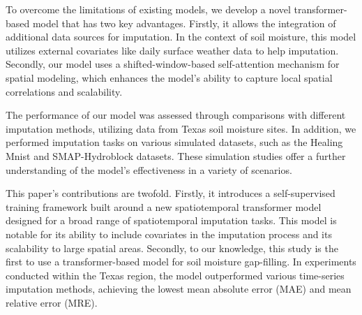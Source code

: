 \documentclass[11pt]{article}
\begin{document}
To overcome the limitations of existing models, we develop a novel transformer-based model that has two key advantages. Firstly, it allows the integration of additional data sources for imputation. In the context of soil moisture, this model utilizes external covariates like daily surface weather data to help imputation. Secondly, our model uses a shifted-window-based self-attention mechanism \citep{liu2021swin} for spatial modeling, which enhances the model's ability to capture local spatial correlations and scalability.

The performance of our model was assessed through comparisons with different imputation methods, utilizing data from Texas soil moisture sites. In addition, we performed imputation tasks on various simulated datasets, such as the Healing Mnist and SMAP-Hydroblock datasets. These simulation studies offer a further understanding of the model's effectiveness in a variety of scenarios.


This paper's contributions are twofold. Firstly, it introduces a self-supervised training framework built around a new spatiotemporal transformer model designed for a broad range of spatiotemporal imputation tasks. This model is notable for its ability to include covariates in the imputation process and its scalability to large spatial areas. Secondly, to our knowledge, this study is the first to use a transformer-based model for soil moisture gap-filling. In experiments conducted within the Texas region, the model outperformed various time-series imputation methods, achieving the lowest mean absolute error (MAE) and mean relative error (MRE).
\end{document}
